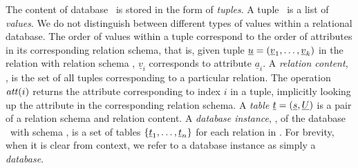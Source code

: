 

The content of database \pDB\ is stored in the form of \emph{tuples}. A tuple
\pTuple\ is a list of \emph{values}. We do not distinguish between
different types of values within a relational database.
%
The order of values within a tuple correspond to the order of attributes in its corresponding
relation schema, that is, given tuple $\pTuple = \paran {\vi {\underline v} k}$
in the relation with relation schema \vRel {},
$\underline{v}_i$ corresponds to attribute $\underline{a}_i$.
%
A \emph{relation content}, \pRelCont, is the set of all tuples  corresponding to a particular relation.
%
The operation $\getAtt {i}$ returns the attribute corresponding to index $i$ in
a tuple, implicitly looking up the attribute in the corresponding relation
schema.
%
A \emph{table} \ensuremath{\pTab = \left(\pRelSch, \pRelCont\right)} is a pair
of a relation schema and relation content.
%
A \emph{database instance}, \pInst, of the database \pDB\ with schema \pSch, is
a set of tables $\setDef {\pTab_1, \ldots, \pTab_n}$ for each relation in
\pSch.
For brevity, when it is clear from context, we refer to a database instance as
simply a \emph{database}.




